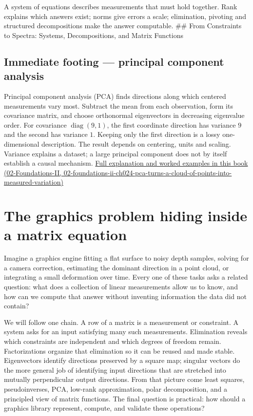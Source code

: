 A system of equations describes measurements that must hold together. Rank explains which answers exist; norms give errors a scale; elimination, pivoting and structured decompositions make the answer computable. \#\# From Constraints to Spectra: Systems, Decompositions, and Matrix Functions

\subsection{Immediate footing --- principal component analysis}\label{01-foundations-i-ch019-immediate-footing-principal-component-analysis}

Principal component analysis (PCA) finds directions along which centered measurements vary most. Subtract the mean from each observation, form its covariance matrix, and choose orthonormal eigenvectors in decreasing eigenvalue order. For covariance \(\operatorname{diag}(9,1)\), the first coordinate direction has variance \(9\) and the second has variance \(1\). Keeping only the first direction is a lossy one-dimensional description. The result depends on centering, units and scaling. Variance explains a dataset; a large principal component does not by itself establish a causal mechanism. \href{../02-Foundations-II/main.pdf\#nameddest=02-foundations-ii-ch024-pca-turns-a-cloud-of-points-into-measured-variation}{Full explanation and worked examples in this book (02-Foundations-II, 02-foundations-ii-ch024-pca-turns-a-cloud-of-points-into-measured-variation)}

\section{The graphics problem hiding inside a matrix equation}\label{01-foundations-i-ch019-the-graphics-problem-hiding-inside-a-matrix-equation}

Imagine a graphics engine fitting a flat surface to noisy depth samples, solving for a camera correction, estimating the dominant direction in a point cloud, or integrating a small deformation over time. Every one of these tasks asks a related question: what does a collection of linear measurements allow us to know, and how can we compute that answer without inventing information the data did not contain?

We will follow one chain. A row of a matrix is a measurement or constraint. A system asks for an input satisfying many such measurements. Elimination reveals which constraints are independent and which degrees of freedom remain. Factorizations organize that elimination so it can be reused and made stable. Eigenvectors identify directions preserved by a square map; singular vectors do the more general job of identifying input directions that are stretched into mutually perpendicular output directions. From that picture come least squares, pseudoinverses, PCA, low-rank approximation, polar decomposition, and a principled view of matrix functions. The final question is practical: how should a graphics library represent, compute, and validate these operations?

